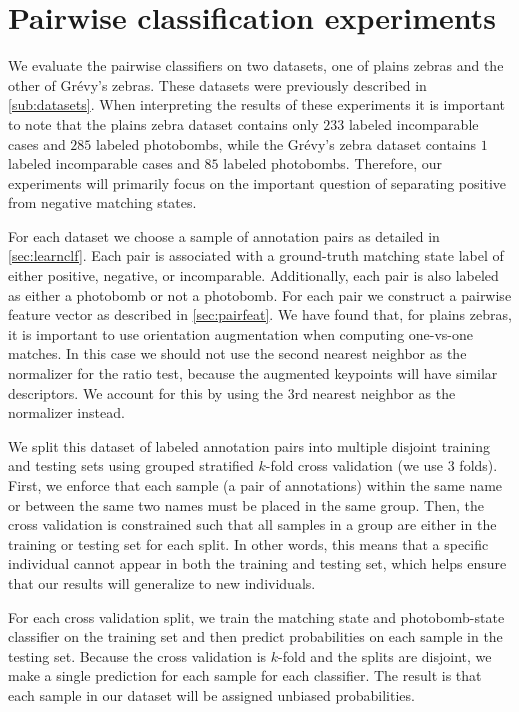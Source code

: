 \section{Pairwise classification experiments}\label{sec:pairexpt}

    We evaluate the pairwise classifiers on two datasets, one of plains zebras and the other of Grévy's zebras.
    These datasets were previously described in \cref{sub:datasets}.
    When interpreting the results of these experiments it is important to note that the plains zebra dataset
      contains only $233$ labeled incomparable cases and $285$ labeled photobombs, while the Grévy's zebra dataset
      contains $1$ labeled incomparable cases and $85$ labeled photobombs.
    Therefore, our experiments will primarily focus on the important question of separating positive from
      negative matching states.

    For each dataset we choose a sample of annotation pairs as detailed in \cref{sec:learnclf}. Each pair is
    associated with a ground-truth matching state label of either positive, negative, or incomparable.
    Additionally, each pair is also labeled as either a photobomb or not a photobomb. For each pair we construct a
    pairwise feature vector as described in \cref{sec:pairfeat}. We have found that, for plains zebras, it is
    important to use orientation augmentation when computing one-vs-one matches. In this case we should not use the
    second nearest neighbor as the normalizer for the ratio test, because the augmented keypoints will have similar
    descriptors. We account for this by using the 3rd nearest neighbor as the normalizer instead.

    We split this dataset of labeled annotation pairs into multiple disjoint training and testing sets using
    grouped stratified $k$-fold cross validation (we use $3$ folds). First, we enforce that each sample (a pair of
    annotations) within the same name or between the same two names must be placed in the same group. Then, the
    cross validation is constrained such that all samples in a group are either in the training or testing set for
    each split. In other words, this means that a specific individual cannot appear in both the training and
    testing set, which helps ensure that our results will generalize to new individuals.

    For each cross validation split, we train the matching state and photobomb-state classifier on the training set
    and then predict probabilities on each sample in the testing set. Because the cross validation is $k$-fold and
    the splits are disjoint, we make a single prediction for each sample for each classifier. The result is that
    each sample in our dataset will be assigned unbiased probabilities.


